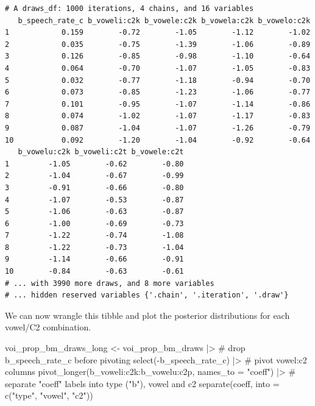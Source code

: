 \documentclass[
  authoryear,
  preprint,
  3p]{elsarticle}
\newenvironment{Shaded}{\begin{snugshade}}{\end{snugshade}}
\newcommand{\AttributeTok}[1]{\textcolor[rgb]{0.40,0.45,0.13}{#1}}
\newcommand{\CommentTok}[1]{\textcolor[rgb]{0.37,0.37,0.37}{#1}}
\newcommand{\FunctionTok}[1]{\textcolor[rgb]{0.28,0.35,0.67}{#1}}
\newcommand{\NormalTok}[1]{\textcolor[rgb]{0.00,0.23,0.31}{#1}}
\newcommand{\OtherTok}[1]{\textcolor[rgb]{0.00,0.23,0.31}{#1}}
\newcommand{\SpecialCharTok}[1]{\textcolor[rgb]{0.37,0.37,0.37}{#1}}
\newcommand{\StringTok}[1]{\textcolor[rgb]{0.13,0.47,0.30}{#1}}
\begin{document}
\begin{verbatim}
# A draws_df: 1000 iterations, 4 chains, and 16 variables
   b_speech_rate_c b_voweli:c2k b_vowele:c2k b_vowela:c2k b_vowelo:c2k
1            0.159        -0.72        -1.05        -1.12        -1.02
2            0.035        -0.75        -1.39        -1.06        -0.89
3            0.126        -0.85        -0.98        -1.10        -0.64
4            0.064        -0.70        -1.07        -1.05        -0.83
5            0.032        -0.77        -1.18        -0.94        -0.70
6            0.073        -0.85        -1.23        -1.06        -0.77
7            0.101        -0.95        -1.07        -1.14        -0.86
8            0.074        -1.02        -1.07        -1.17        -0.83
9            0.087        -1.04        -1.07        -1.26        -0.79
10           0.092        -1.20        -1.04        -0.92        -0.64
   b_vowelu:c2k b_voweli:c2t b_vowele:c2t
1         -1.05        -0.62        -0.80
2         -1.04        -0.67        -0.99
3         -0.91        -0.66        -0.80
4         -1.07        -0.53        -0.87
5         -1.06        -0.63        -0.87
6         -1.00        -0.69        -0.73
7         -1.22        -0.74        -1.08
8         -1.22        -0.73        -1.04
9         -1.14        -0.66        -0.91
10        -0.84        -0.63        -0.61
# ... with 3990 more draws, and 8 more variables
# ... hidden reserved variables {'.chain', '.iteration', '.draw'}
\end{verbatim}

We can now wrangle this tibble and plot the posterior distributions for
each vowel/C2 combination.

\begin{Shaded}
\begin{Highlighting}[]
\NormalTok{voi\_prop\_bm\_draws\_long }\OtherTok{\textless{}{-}}\NormalTok{ voi\_prop\_bm\_draws }\SpecialCharTok{|\textgreater{}} 
  \CommentTok{\# drop b\_speech\_rate\_c before pivoting}
  \FunctionTok{select}\NormalTok{(}\SpecialCharTok{{-}}\NormalTok{b\_speech\_rate\_c) }\SpecialCharTok{|\textgreater{}} 
  \CommentTok{\# pivot vowel:c2 columns}
  \FunctionTok{pivot\_longer}\NormalTok{(}\StringTok{\textasciigrave{}}\AttributeTok{b\_voweli:c2k}\StringTok{\textasciigrave{}}\SpecialCharTok{:}\StringTok{\textasciigrave{}}\AttributeTok{b\_vowelu:c2p}\StringTok{\textasciigrave{}}\NormalTok{, }\AttributeTok{names\_to =} \StringTok{"coeff"}\NormalTok{) }\SpecialCharTok{|\textgreater{}} 
  \CommentTok{\# separate "coeff" labels into type ("b"), vowel and c2}
  \FunctionTok{separate}\NormalTok{(coeff, }\AttributeTok{into =} \FunctionTok{c}\NormalTok{(}\StringTok{"type"}\NormalTok{, }\StringTok{"vowel"}\NormalTok{, }\StringTok{"c2"}\NormalTok{))}
\end{Highlighting}
\end{Shaded}
\end{document}
